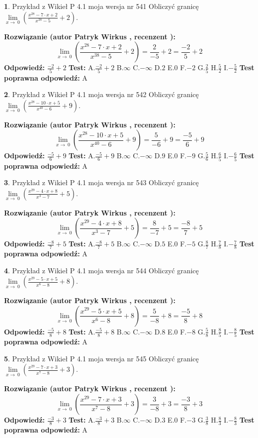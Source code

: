 \documentclass[12pt, a4paper]{article}
\theoremstyle{definition} %
\newtheorem{zad}{}
\newcommand{\zadStart}[1]{\begin{zad}#1\newline}
\newcommand{\zadStop}{\end{zad}}
\newcommand{\rozwStart}[2]{\noindent \textbf{Rozwiązanie (autor #1 , recenzent #2): }\newline}
\newcommand{\rozwStop}{\newline}
\newcommand{\odpStart}{\noindent \textbf{Odpowiedź:}\newline}
\newcommand{\odpStop}{\newline}
\newcommand{\testStart}{\noindent \textbf{Test:}\newline}
\newcommand{\testStop}{\newline}
\newcommand{\kluczStart}{\noindent \textbf{Test poprawna odpowiedź:}\newline}
\newcommand{\kluczStop}{\newline}
\begin{document}
\zadStart{Przykład z Wikieł P 4.1 moja wersja nr 541}
Obliczyć granicę $\lim\limits_{x\to\ 0}(\frac{x^{28}-7 \cdot x +2}{x^{38}-5}+2)$.
\zadStop
\rozwStart{Patryk Wirkus}{}
$$\lim\limits_{x\to\ 0}(\frac{x^{28}-7 \cdot x +2}{x^{38}-5}+2)=\frac{2}{-5}+2=\frac{-2}{5}+2$$
\rozwStop
\odpStart
$\frac{-2}{5}+2$
\odpStop
\testStart
A.$\frac{-2}{5}+2$
B.$\infty$
C.$-\infty$
D.$2$
E.$0$
F.$-2$
G.$\frac{2}{5}$
H.$\frac{5}{2}$
I.$-\frac{5}{2}$
\testStop
\kluczStart
A
\kluczStop



\zadStart{Przykład z Wikieł P 4.1 moja wersja nr 542}
Obliczyć granicę $\lim\limits_{x\to\ 0}(\frac{x^{28}-10 \cdot x +5}{x^{40}-6}+9)$.
\zadStop
\rozwStart{Patryk Wirkus}{}
$$\lim\limits_{x\to\ 0}(\frac{x^{28}-10 \cdot x +5}{x^{40}-6}+9)=\frac{5}{-6}+9=\frac{-5}{6}+9$$
\rozwStop
\odpStart
$\frac{-5}{6}+9$
\odpStop
\testStart
A.$\frac{-5}{6}+9$
B.$\infty$
C.$-\infty$
D.$9$
E.$0$
F.$-9$
G.$\frac{5}{6}$
H.$\frac{6}{5}$
I.$-\frac{6}{5}$
\testStop
\kluczStart
A
\kluczStop



\zadStart{Przykład z Wikieł P 4.1 moja wersja nr 543}
Obliczyć granicę $\lim\limits_{x\to\ 0}(\frac{x^{29}-4 \cdot x +8}{x^{3}-7}+5)$.
\zadStop
\rozwStart{Patryk Wirkus}{}
$$\lim\limits_{x\to\ 0}(\frac{x^{29}-4 \cdot x +8}{x^{3}-7}+5)=\frac{8}{-7}+5=\frac{-8}{7}+5$$
\rozwStop
\odpStart
$\frac{-8}{7}+5$
\odpStop
\testStart
A.$\frac{-8}{7}+5$
B.$\infty$
C.$-\infty$
D.$5$
E.$0$
F.$-5$
G.$\frac{8}{7}$
H.$\frac{7}{8}$
I.$-\frac{7}{8}$
\testStop
\kluczStart
A
\kluczStop



\zadStart{Przykład z Wikieł P 4.1 moja wersja nr 544}
Obliczyć granicę $\lim\limits_{x\to\ 0}(\frac{x^{29}-5 \cdot x +5}{x^{6}-8}+8)$.
\zadStop
\rozwStart{Patryk Wirkus}{}
$$\lim\limits_{x\to\ 0}(\frac{x^{29}-5 \cdot x +5}{x^{6}-8}+8)=\frac{5}{-8}+8=\frac{-5}{8}+8$$
\rozwStop
\odpStart
$\frac{-5}{8}+8$
\odpStop
\testStart
A.$\frac{-5}{8}+8$
B.$\infty$
C.$-\infty$
D.$8$
E.$0$
F.$-8$
G.$\frac{5}{8}$
H.$\frac{8}{5}$
I.$-\frac{8}{5}$
\testStop
\kluczStart
A
\kluczStop



\zadStart{Przykład z Wikieł P 4.1 moja wersja nr 545}
Obliczyć granicę $\lim\limits_{x\to\ 0}(\frac{x^{29}-7 \cdot x +3}{x^{7}-8}+3)$.
\zadStop
\rozwStart{Patryk Wirkus}{}
$$\lim\limits_{x\to\ 0}(\frac{x^{29}-7 \cdot x +3}{x^{7}-8}+3)=\frac{3}{-8}+3=\frac{-3}{8}+3$$
\rozwStop
\odpStart
$\frac{-3}{8}+3$
\odpStop
\testStart
A.$\frac{-3}{8}+3$
B.$\infty$
C.$-\infty$
D.$3$
E.$0$
F.$-3$
G.$\frac{3}{8}$
H.$\frac{8}{3}$
I.$-\frac{8}{3}$
\testStop
\kluczStart
A
\kluczStop
\end{document}
